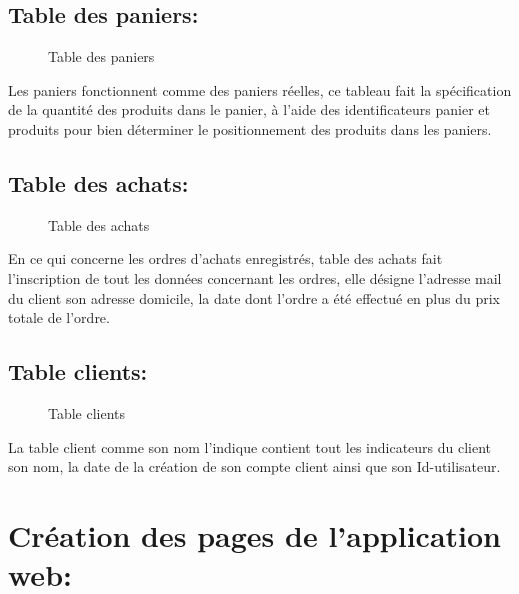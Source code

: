 \documentclass[a4paper]{report}
\begin{document}
\begin{doublespace}
    \subsection{ Table des paniers: }
    \begin{figure}[H]

        \caption{Table des paniers}
    \end{figure}
    Les paniers fonctionnent comme des paniers réelles, ce
    tableau fait la spécification de la quantité des produits dans le panier,  à
    l'aide des identificateurs panier et produits pour bien déterminer le
    positionnement des produits dans les paniers.
    \subsection{ Table des achats: }
    \begin{figure}[H]

        \caption{Table des achats}
    \end{figure}
    En ce qui concerne les ordres d'achats enregistrés,
    table  des achats fait l'inscription de tout les données concernant les ordres,
    elle désigne l'adresse mail du client son adresse domicile, la	date dont
    l'ordre a été effectué en plus du prix totale de l'ordre.
    \subsection{ Table clients: }
    \begin{figure}[H]

        \caption{Table clients}
    \end{figure}
    La table client comme son nom l'indique contient tout
    les indicateurs du client son nom, la date de la création de son compte client
    ainsi que son Id-utilisateur.

    \section{Création des pages de l'application web:}

\end{doublespace}
\end{document}
